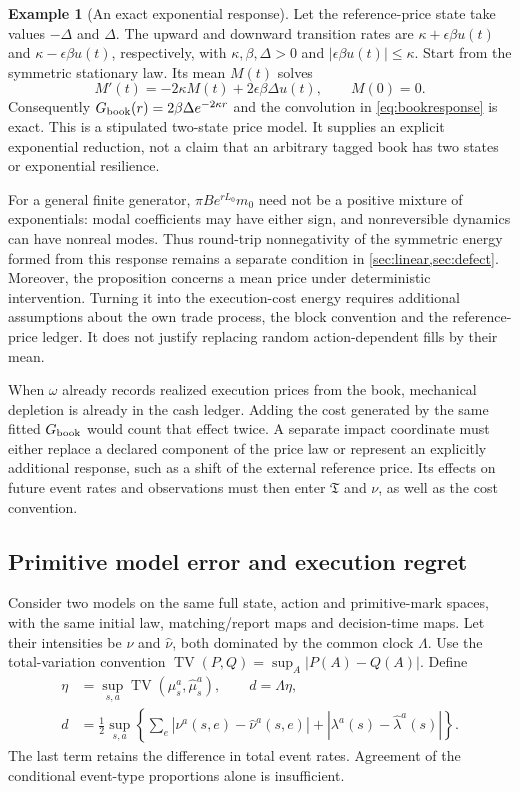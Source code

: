 \documentclass[11pt]{article}
\numberwithin{equation}{section}
\theoremstyle{definition}
\theoremstyle{remark}
\theoremstyle{definition}
\newtheorem{example}[theorem]{Example}
\newcommand{\TV}{\operatorname{TV}}
\begin{document}
\begin{example}[An exact exponential response]\label{ex:bookexponential}
Let the reference-price state take values $-\Delta$ and $\Delta$. The upward
and downward transition rates are $\kappa+\epsilon\beta u(t)$ and
$\kappa-\epsilon\beta u(t)$, respectively, with $\kappa,\beta,\Delta>0$
and $|\epsilon\beta u(t)|\le\kappa$. Start from the symmetric stationary
law. Its mean $M(t)$ solves
\[
 M'(t)=-2\kappa M(t)+2\epsilon\beta\Delta u(t),\qquad M(0)=0.
\]
Consequently $G_{\rm book}(r)=2\beta\Delta e^{-2\kappa r}$ and the
convolution in \eqref{eq:bookresponse} is exact. This is a stipulated
two-state price model. It supplies an explicit exponential reduction, not a
claim that an arbitrary tagged book has two states or exponential resilience.
\end{example}

For a general finite generator, $\pi B e^{rL_0}m_0$ need not be a positive
mixture of exponentials: modal coefficients may have either sign, and
nonreversible dynamics can have nonreal modes. Thus round-trip
nonnegativity of the symmetric energy formed from this response remains a
separate condition in \cref{sec:linear,sec:defect}. Moreover, the proposition
concerns a mean price under deterministic intervention. Turning it into the
execution-cost energy requires additional assumptions about the own trade
process, the block convention and the reference-price ledger. It does not
justify replacing random action-dependent fills by their mean.

When $\omega$ already records realized execution prices from the book,
mechanical depletion is already in the cash ledger. Adding the cost generated
by the same fitted $G_{\rm book}$ would count that effect twice. A separate
impact coordinate must either replace a declared component of the price law
or represent an explicitly additional response, such as a shift of the
external reference price. Its effects on future event rates and observations
must then enter $\mathfrak T$ and $\nu$, as well as the cost convention.

\subsection{Primitive model error and execution regret}
\label{sec:primitivemodelerror}

Consider two models on the same full state, action and primitive-mark spaces,
with the same initial law, matching/report maps and decision-time maps. Let
their intensities be $\nu$ and $\widehat\nu$, both dominated by the common
clock $\Lambda$. Use the total-variation convention
$\TV(P,Q)=\sup_A|P(A)-Q(A)|$. Define
\begin{align}\label{eq:primitiveerror}
 \eta&=\sup_{s,a}\TV(\mu_s^a,\widehat\mu_s^a),\qquad d=\Lambda\eta,\\
 d&=\frac12\sup_{s,a}\left\{
       \sum_e|\nu^a(s,e)-\widehat\nu^a(s,e)|
       +|\lambda^a(s)-\widehat\lambda^a(s)|\right\}.\nonumber
\end{align}
The last term retains the difference in total event rates. Agreement of the
conditional event-type proportions alone is insufficient.
\end{document}
